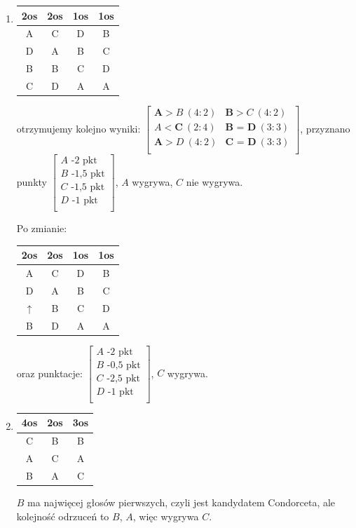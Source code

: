 \documentclass[12pt,a4paper]{article}
\theoremstyle{break}
\begin{document}
\begin{enumerate}[K1)]
			\item \begin{tabular}{|c|c|c|c|}\hline
				2os & 2os & 1os & 1os\\\hline
				A & C & D & B\\\hline
				D & A & B & C\\\hline
				B & B & C & D\\\hline
				C & D & A & A\\\hline
			\end{tabular} otrzymujemy kolejno wyniki: $\begin{bmatrix}
				\textbf{A} > B\:(4:2) & \textbf{B} > C\:(4:2)\\
				A < \textbf{C}\:(2:4) & \textbf{B = D}\:(3:3)\\
				\textbf{A} > D\:(4:2) & \textbf{C = D}\:(3:3)\\
			\end{bmatrix}$, przyznano punkty $\begin{bmatrix}
				A\text{ -2 pkt}\\
				B\text{ -1,5 pkt}\\
				C\text{ -1,5 pkt}\\
				D\text{ -1 pkt}\\
			\end{bmatrix}$, $A$ wygrywa, $C$ nie wygrywa.
			
			Po zmianie: \begin{tabular}{|c|c|c|c|}\hline
				2os & 2os & 1os & 1os\\\hline
				A & C & D & B\\\hline
				D & A & B & C\\\hline
				\textbf{$\uparrow$} & B & C & D\\\hline
				B & D & A & A\\\hline
			\end{tabular} oraz punktacje: $\begin{bmatrix}
				A\text{ -2 pkt}\\
				B\text{ -0,5 pkt}\\
				C\text{ -2,5 pkt}\\
				D\text{ -1 pkt}\\
			\end{bmatrix}$, $C$ wygrywa.
			
			\item \begin{tabular}{|c|c|c|}\hline
				4os & 2os & 3os\\\hline
				C & B & B\\\hline
				A & C & A\\\hline
				B & A & C\\\hline
			\end{tabular} $B$ ma najwięcej głosów pierwszych, czyli jest kandydatem Condorceta, ale kolejność odrzuceń to $B$, $A$, więc wygrywa $C$.
			

\end{enumerate}
\end{document}
